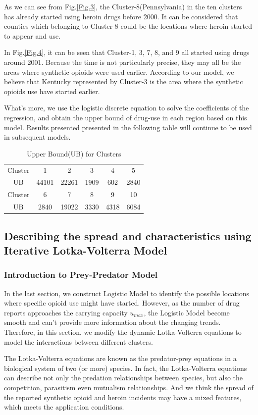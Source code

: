 \documentclass[12pt]{article}
\begin{document}
As we can see from Fig.\ref{Fig.3}, the Cluster-8(Pennsylvania) in the ten clusters has already started using heroin drugs before 2000. It can be considered that counties which belonging to Cluster-8 could be the locations where heroin started to appear and use.

In Fig.\ref{Fig.4}, it can be seen that Cluster-1, 3, 7, 8, and 9 all started using drugs around 2001. Because the time is not particularly precise, they may all be the areas where synthetic opioids were used earlier. According to our model, we believe that Kentucky represented by Cluster-3 is the area where the synthetic opioids use have started earlier.

What's more, we use the logistic discrete equation to solve the coefficients of the regression, and obtain the upper bound of drug-use in each region based on this model. Results presented presented in the following table will continue to be used in subsequent models.
\begin{table}[H]
	\centering
	\caption{Upper Bound(UB) for Clusters}
	\begin{tabular}
	{cccccc}
	\toprule[1pt]
	Cluster	& 1 & 2 & 3 & 4 &5 \\
	UB	& 44101 & 22261 & 1909 & 602 & 2840\\
	\midrule
	Cluster	& 6 & 7 &  8 & 9 & 10 \\
	UB & 2840 & 19022 & 3330 & 4318 & 6084\\
	\bottomrule[1pt]
	\end{tabular}
\end{table}

\subsection{Describing the spread and characteristics using Iterative Lotka-Volterra Model}
\subsubsection{Introduction to Prey-Predator Model}
In the last section, we construct Logistic Model to identify the possible locations where specific opioid use might have started. However, as the number of drug reports approaches the carrying capacity $u_{max}$, the Logistic Model become smooth and can't provide more information about the changing trends. Therefore, in this section, we modify the dynamic Lotka-Volterra equations to model the interactions between different clusters.
	
The Lotka-Volterra equations are known as the predator-prey equations in a biological system of two (or more) species. In fact, the Lotka-Volterra equations can describe not only the predation relationships between species, but also the competition, parasitism even mutualism relationships. And we think the spread of the reported synthetic opioid and heroin incidents may have a mixed features, which meets the application conditions.
\end{document}

